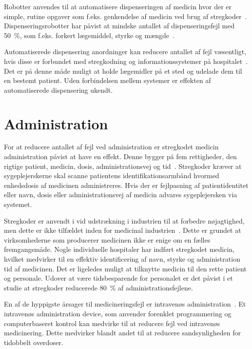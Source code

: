 Robotter anvendes til at automatisere dispenseringen af medicin hvor der er simple, rutine opgaver som f.eks. genkendelse af medicin ved brug af stregkoder~\citep{Kaushal2002}. Dispenseringsrobotter har påvist at mindske antallet af dispenseringsfejl med 50~\%, som f.eks. forkert lægemiddel, styrke og mængde~\citep{Stephen2013}.

Automatiserede dispensering anordninger kan reducere antallet af fejl væsentligt, hvis disse er forbundet med stregkodning og informationssystemer på hospitalet~\citep{Bates2000a}. Det er på denne måde muligt at holde lægemidler på et sted og udelade dem til en bestemt patient. Uden forbindelsen mellem systemer er effekten af automatiserede dispensering ukendt.~\citep{Bates2000a} 

\section{Administration}
For at reducere antallet af fejl ved administration er stregkodet medicin administration påvist at have en effekt. Denne bygger på fem rettigheder, den rigtige patient, medicin, dosis, administrationsvej og tid~\citep{Agrawal2009}. Stregkoder kræver at sygeplejerskerne skal scanne patientens identifikationsarmbånd hvormed enhedsdosis af medicinen administreres. Hvis der er fejlpasning af patientidentitet eller navn, dosis eller administrationsvej af medicin advares sygeplejersken via systemet.~\citep{Agrawal2009} 

Stregkoder er anvendt i vid udstrækning i industrien til at forbedre nøjagtighed, men dette er ikke tilfældet inden for medicinal industrien~\citep{Kaushal2002}. Dette er grundet at virksomhederne som producerer medicinen ikke er enige om en fælles fremgangsmåde. Nogle individuelle hospitaler har indført stregkodet medicin, hvilket medvirker til en effektiv identificering af navn, styrke og administration tid af medicinen. Det er ligeledes muligt at tilknytte medicin til den rette patient og personale. Udover at være tidsbesparende for personalet er det påvist i et studie at stregkoder reducerede 80~\% af administrationsfejlene.~\citep{Kaushal2002}

En af de hyppigste årsager til medicineringsfejl er intravenøs administration~\citep{Kaushal2002}. Et intravenøs administration device, som anvender forenklet programmering og computerbaseret kontrol kan medvirke til at reducere fejl ved intravenøs medicinering. Dette medvirker blandt andet til at reducere sandsynligheden for tidobbelt overdoser.~\citep{Kaushal2002}



